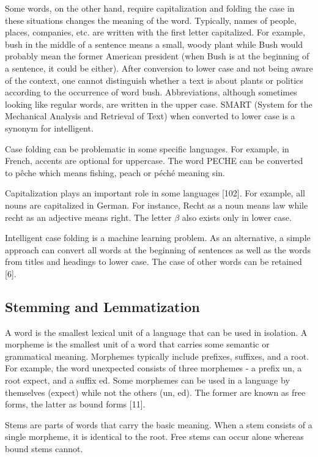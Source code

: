 \documentclass[11pt,openany,executivepaper]{book}
\begin{document}
Some words, on the other hand, require capitalization and folding the case in these situations changes the meaning of the word. Typically, names of people, places, companies, etc. are written with the first letter capitalized. For example, bush in the middle of a sentence means a small, woody plant while Bush would probably mean the former American president (when Bush is at the beginning of a sentence, it could be either). After conversion to lower case and not being aware of the context, one cannot distinguish whether a text is about plants or politics according to the occurrence of word bush. Abbreviations, although sometimes looking like regular words, are written in the upper case. SMART (System for the Mechanical Analysis and Retrieval of Text) when converted to lower case is a synonym for intelligent.

Case folding can be problematic in some specific languages. For example, in French, accents are optional for uppercase. The word PECHE can be converted to pêche which means fishing, peach or péché meaning sin.

Capitalization plays an important role in some languages [102]. For example, all nouns are capitalized in German. For instance, Recht as a noun means law while recht as an adjective means right. The letter $\beta$ also exists only in lower case.

Intelligent case folding is a machine learning problem. As an alternative, a simple approach can convert all words at the beginning of sentences as well as the words from titles and headings to lower case. The case of other words can be retained [6].

\subsection{Stemming and Lemmatization}
A word is the smallest lexical unit of a language that can be used in isolation. A morpheme is the smallest unit of a word that carries some semantic or grammatical meaning. Morphemes typically include prefixes, suffixes, and a root. For example, the word unexpected consists of three morphemes - a prefix un, a root expect, and a suffix ed. Some morphemes can be used in a language by themselves (expect) while not the others (un, ed). The former are known as free forms, the latter as bound forms [11].

Stems are parts of words that carry the basic meaning. When a stem consists of a single morpheme, it is identical to the root. Free stems can occur alone whereas bound stems cannot.
\end{document}
